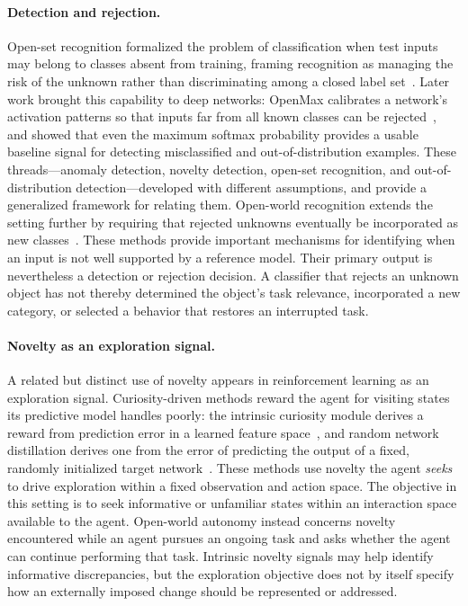 \paragraph{Detection and rejection.}
Open-set recognition formalized the problem of classification when test inputs may belong to classes absent from training, framing recognition as managing the risk of the unknown rather than discriminating among a closed label set~\citep{scheirer2013toward}.
Later work brought this capability to deep networks: OpenMax calibrates a network's activation patterns so that inputs far from all known classes can be rejected~\citep{bendale2016towards}, and \citet{hendrycks2017baseline} showed that even the maximum softmax probability provides a usable baseline signal for detecting misclassified and out-of-distribution examples.
These threads---anomaly detection, novelty detection, open-set recognition, and out-of-distribution detection---developed with different assumptions, and \citet{yang2024generalized} provide a generalized framework for relating them.
Open-world recognition extends the setting further by requiring that rejected unknowns eventually be incorporated as new classes~\citep{boult2021towards}.
These methods provide important mechanisms for identifying when an input is not well supported by a reference model.
Their primary output is nevertheless a detection or rejection decision.
A classifier that rejects an unknown object has not thereby determined the object's task relevance, incorporated a new category, or selected a behavior that restores an interrupted task.

\paragraph{Novelty as an exploration signal.}
A related but distinct use of novelty appears in reinforcement learning as an exploration signal.
Curiosity-driven methods reward the agent for visiting states its predictive model handles poorly: the intrinsic curiosity module derives a reward from prediction error in a learned feature space~\citep{pathak2017curiosity}, and random network distillation derives one from the error of predicting the output of a fixed, randomly initialized target network~\citep{burda2019exploration}.
These methods use novelty the agent \emph{seeks} to drive exploration within a fixed observation and action space.
The objective in this setting is to seek informative or unfamiliar states within an interaction space available to the agent.
Open-world autonomy instead concerns novelty encountered while an agent pursues an ongoing task and asks whether the agent can continue performing that task.
Intrinsic novelty signals may help identify informative discrepancies, but the exploration objective does not by itself specify how an externally imposed change should be represented or addressed.

